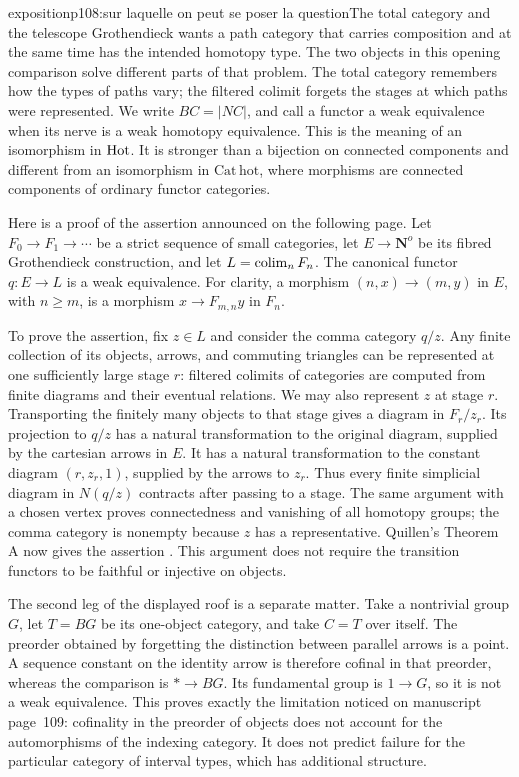 \begin{dcomment}{exposition}{p108:sur laquelle on peut se poser la question}{The total category and the telescope}
Grothendieck wants a path category that carries composition and at the same time has the intended homotopy type. The two objects in this opening comparison solve different parts of that problem. The total category remembers how the types of paths vary; the filtered colimit forgets the stages at which paths were represented. We write $BC=|NC|$, and call a functor a weak equivalence when its nerve is a weak homotopy equivalence. This is the meaning of an isomorphism in $\mathrm{Hot}$. It is stronger than a bijection on connected components and different from an isomorphism in $\mathrm{Cat\,hot}$, where morphisms are connected components of ordinary functor categories.

Here is a proof of the assertion announced on the following page. Let $F_0\to F_1\to\cdots$ be a strict sequence of small categories, let $E\to\mathbf N^o$ be its fibred Grothendieck construction, and let $L=\mathop{\rm colim}_nF_n$. The canonical functor $q:E\to L$ is a weak equivalence. For clarity, a morphism $(n,x)\to(m,y)$ in $E$, with $n\geq m$, is a morphism $x\to F_{m,n}y$ in $F_n$.

To prove the assertion, fix $z\in L$ and consider the comma category $q/z$. Any finite collection of its objects, arrows, and commuting triangles can be represented at one sufficiently large stage $r$: filtered colimits of categories are computed from finite diagrams and their eventual relations. We may also represent $z$ at stage $r$. Transporting the finitely many objects to that stage gives a diagram in $F_r/z_r$. Its projection to $q/z$ has a natural transformation to the original diagram, supplied by the cartesian arrows in $E$. It has a natural transformation to the constant diagram $(r,z_r,1)$, supplied by the arrows to $z_r$. Thus every finite simplicial diagram in $N(q/z)$ contracts after passing to a stage. The same argument with a chosen vertex proves connectedness and vanishing of all homotopy groups; the comma category is nonempty because $z$ has a representative. Quillen's Theorem A now gives the assertion \citep[\S1, Theorem A]{Quillen1973}. This argument does not require the transition functors to be faithful or injective on objects.

The second leg of the displayed roof is a separate matter. Take a nontrivial group $G$, let $T=BG$ be its one-object category, and take $C=T$ over itself. The preorder obtained by forgetting the distinction between parallel arrows is a point. A sequence constant on the identity arrow is therefore cofinal in that preorder, whereas the comparison is $*\to BG$. Its fundamental group is $1\to G$, so it is not a weak equivalence. This proves exactly the limitation noticed on manuscript page~109: cofinality in the preorder of objects does not account for the automorphisms of the indexing category. It does not predict failure for the particular category of interval types, which has additional structure.
\end{dcomment}


